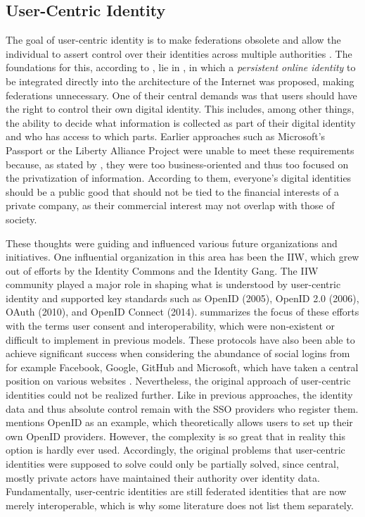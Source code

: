 	    \subsection{User-Centric Identity}
	    The goal of user-centric identity is to make federations obsolete and allow the individual to assert control over their identities across multiple authorities \cite{allen_path_2016}. The foundations for this, according to \cite{allen_path_2016}, lie in \cite{jordan_augmented_2003}, in which a \textit{persistent online identity} to be integrated directly into the architecture of the Internet was proposed, making federations unnecessary. One of their central demands was that users should have the right to control their own digital identity. This includes, among other things, the ability to decide what information is collected as part of their digital identity and who has access to which parts. Earlier approaches such as Microsoft's Passport or the Liberty Alliance Project were unable to meet these requirements because, as stated by \cite{jordan_augmented_2003}, they were too business-oriented and thus too focused on the privatization of information. According to them, everyone's digital identities should be a public good that should not be tied to the financial interests of a private company, as their commercial interest may not overlap with those of society. 
	    
	    These thoughts were guiding and influenced various future organizations and initiatives. One influential organization in this area has been the \acf{IIW}, which grew out of efforts by the Identity Commons and the Identity Gang. The \ac{IIW} community played a major role in shaping what is understood by user-centric identity and supported key standards such as OpenID (2005), OpenID 2.0 (2006), OAuth (2010), and OpenID Connect (2014). \cite{allen_path_2016} summarizes the focus of these efforts with the terms user consent and interoperability, which were non-existent or difficult to implement in previous models. These protocols have also been able to achieve significant success when considering the abundance of social logins from for example Facebook, Google, GitHub and Microsoft, which have taken a central position on various websites \cite[p. 8]{preukschat_self-sovereign_2021}. Nevertheless, the original approach of user-centric identities could not be realized further. Like in previous approaches, the identity data and thus absolute control remain with the \ac{SSO} providers who register them. \cite{allen_path_2016} mentions OpenID as an example, which theoretically allows users to set up their own OpenID providers. However, the complexity is so great that in reality this option is hardly ever used. Accordingly, the original problems that user-centric identities were supposed to solve could only be partially solved, since central, mostly private actors have maintained their authority over identity data. Fundamentally, user-centric identities are still federated identities that are now merely interoperable, which is why some literature \cite{ehrlich_self-sovereign_2021, preukschat_self-sovereign_2021} does not list them separately. \cite{allen_path_2016} 
	    
